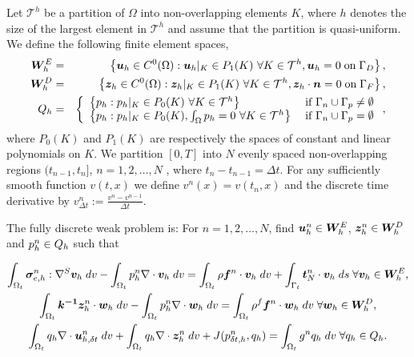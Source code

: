 Let $\mathcal{T}^{h}$ be a partition of $\Omega$ into non-overlapping elements $K$, where $h$ denotes the size of the largest element in $\mathcal{T}^{h}$ and assume that the partition is quasi-uniform. We define the following finite element spaces,
\begin{eqnarray*}
\boldsymbol{W}^{E}_{h} &=& \left\{ \boldsymbol{u}_{h}  \in C^{0}(\Omega): \boldsymbol{u}_{h} |_{K} \in P_{1}(K) \ \forall K \in \mathcal{T}^{h}, \boldsymbol{u}_{h}  = 0 \; \mbox{on} \;\Gamma_{D} \right\},  \\
\boldsymbol{W}^{D}_{h} &=&\left\{ \boldsymbol{z}_{h}  \in C^{0}(\Omega): \boldsymbol{z}_{h} |_{K} \in P_{1}(K) \ \forall K \in \mathcal{T}^{h},  \boldsymbol{z}_{h} \cdot \boldsymbol{n} = 0 \; \mbox{on} \;\Gamma_{F} \right\}, \\
{Q}_{h} &=& \left\{
  \begin{array}{l l}
    \left\{ p_h: p_h |_{K} \in P_{0}(K) \ \forall K \in \mathcal{T}^{h} \right\} & \; \text{if $\Gamma_{n} \cup \Gamma_{p} \neq \emptyset$}\\
    \left\{ p_h: p_h |_{K} \in P_{0}(K), \int_{\Omega}  p_h =0 \ \forall K \in \mathcal{T}^{h}\right\} & \; \text{if $\Gamma_{n} \cup \Gamma_{p}=\emptyset$}
  \end{array} \right. ,
\end{eqnarray*}
where $P_{0}(K)$ and $P_{1}(K)$ are respectively the spaces of constant and linear polynomials on $K$. We partition $[0,T]$ into $N$ evenly spaced non-overlapping regions $(t_{n-1}, t_n]$, $n=1,2,\dots, N$ , where $t_n-t_{n-1} = \Delta t$. For any sufficiently smooth function $v(t,x)$ we define $v^n(x) = v(t_n,x)$  and the discrete time derivative by $v_{\Delta t}^{n} := \frac{v^{n}-v^{n-1}}{\Delta t}$.

The fully discrete weak problem is: For $n = 1,2, \ldots,N$, find $\boldsymbol{u}_{h}^{n} \in \boldsymbol{W}^{E}_{h}$, $\boldsymbol{z}_{h}^{n} \in \boldsymbol{W}^{D}_{h}$ and $p_h^{n} \in {Q}_{h} $ such that


\begin{multline}
\label{eqns:weak_disc_system}
\int_{\Omega_{t}}\boldsymbol{\sigma}_{e,h}^{n}
                 : \nabla^{S} \boldsymbol{v}_{h} \; dv
 - \int_{\Omega_{t}}  p_h^{n}   \nabla \cdot \boldsymbol{v}_{h}  \; dv
= \int_{\Omega_{t}}  \rho \boldsymbol{f}^{n} \cdot \boldsymbol{v}_{h}  \; dv
 + \int_{\Gamma_{t}} \boldsymbol{t}_{N}^{n} \cdot \boldsymbol{v}_{h}  \; ds \;
   \forall \boldsymbol{v}_{h} \in \boldsymbol{W}^{E}_{h}, \\
\int_{\Omega_{t}} \boldsymbol{k^{-1}} \boldsymbol{z}_{h}^{n} \cdot \boldsymbol{w}_{h} \; dv
  - \int_{\Omega_{t}}  p_h^{n}  \nabla \cdot\boldsymbol{w}_{h} \; dv
= \int_{\Omega_{t}} \rho^{f} \boldsymbol{f}^{n} \cdot \boldsymbol{w}_{h} \; dv \; \forall\boldsymbol{w}_{h}\in \boldsymbol{W}^{D}_{h},  \\
\int_{\Omega_{t}} {q}_{h} \nabla \cdot  {\boldsymbol{u}^{n}_{h, \delta t}} \; dv
 + \int_{\Omega_{t}} {q}_{h} \nabla \cdot \boldsymbol{z}_{h}^{n} \; dv + J({{p}_{\delta t,h}^{n}},{q}_{h})
= \int_{\Omega_{t}} g^{n}   {q}_{h} \; dv  \; \forall {q}_{h} \in {Q}_{h}.
\end{multline}
 

